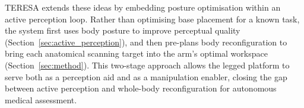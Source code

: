 \ac{TERESA} extends these ideas by embedding posture optimisation within an
active perception loop. Rather than optimising base placement for a known
task, the system first uses body posture to improve perceptual quality
(Section~\ref{sec:active_perception}), and then pre-plans body
reconfiguration to bring each anatomical scanning target into the arm's
optimal workspace (Section~\ref{sec:method}). This two-stage approach allows
the legged platform to serve both as a perception aid and as a manipulation
enabler, closing the gap between active perception and whole-body
reconfiguration for autonomous medical assessment.
